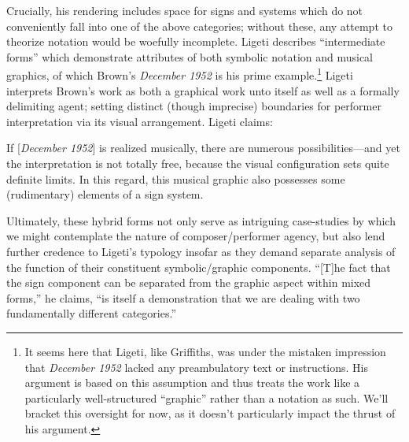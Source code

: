  Crucially, his rendering includes space for signs and systems which do not conveniently fall into one of the above categories; without these, any attempt to theorize notation would be woefully incomplete. Ligeti describes ``intermediate forms'' which demonstrate attributes of both symbolic notation and musical graphics, of which Brown's \textit{December 1952} is his prime example.\footnote{It seems here that Ligeti, like Griffiths, was under the mistaken impression that \textit{December 1952} lacked any preambulatory text or instructions. His argument is based on this assumption and thus treats the work like a particularly well-structured ``graphic'' rather than a notation as such. We'll bracket this oversight for now, as it doesn't particularly impact the thrust of his argument.} Ligeti interprets Brown's work as both a graphical work unto itself as well as a formally delimiting agent; setting distinct (though imprecise) boundaries for performer interpretation via its visual arrangement. Ligeti claims:

\begin{smallquote}
    If [\textit{December 1952}] is realized musically, there are numerous possibilities---and yet the interpretation is not totally free, because the visual configuration sets quite definite limits. In this regard, this musical graphic also possesses some (rudimentary) elements of a sign system.\autocite[177]{Ligeti_1965}
\end{smallquote}

\noindent Ultimately, these hybrid forms not only serve as intriguing case-studies by which we might contemplate the nature of composer/performer agency, but also lend further credence to Ligeti's typology insofar as they demand separate analysis of the function of their constituent symbolic/graphic components. ``[T]he fact that the sign component can be separated from the graphic aspect within mixed forms,'' he claims, ``is itself a demonstration that we are dealing with two fundamentally different categories.''\autocite[177]{Ligeti_1965}

